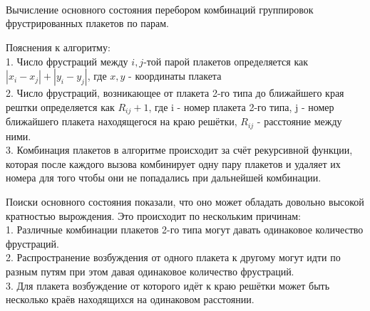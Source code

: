 \documentclass[utf8, babel, sor, jor, amsmath, amssymb, reprint]{elsarticle} %
\begin{document}
\begin{algorithm}[H]
\begin{algorithmic}
{		}
		{
			{
				{
					{
					}
					\ELSE 
					{}
					\ENDIF\\}
				\ENDFOR\\
			}
			\ENDFOR\\
		}
		
	\end{algorithmic}
	\caption{Вычисление основного состояния перебором комбинаций группировок фрустрированных плакетов по парам.}
	\label{alg:alg_2}
\end{algorithm}



Пояснения к алгоритму:\\
1. Число фрустраций между $i,j$-той парой плакетов определяется как $\left|x_i-x_j\right|+\left|y_i-y_j\right|$, где $x, y$ - координаты плакета\\
2. Число фрустраций, возникающее от плакета 2-го типа до ближайшего края рештки определяется как $R_{ij}+1$, где i - номер плакета 2-го типа, j - номер ближайшего плакета находящегося на краю решётки, $R_{ij}$ - расстояние между ними.\\
3. Комбинация плакетов в алгоритме происходит за счёт рекурсивной функции, которая после каждого вызова комбинирует одну пару плакетов и удаляет их номера для того чтобы они не попадались при дальнейшей комбинации. 

Поиски основного состояния показали, что оно может обладать довольно высокой кратностью вырождения. Это происходит по нескольким причинам:\\
1. Различные комбинации плакетов 2-го типа могут давать одинаковое количество фрустраций.\\
2. Распространение возбуждения от одного плакета к другому могут идти по разным путям при этом давая одинаковое количество фрустраций.\\
3. Для плакета возбуждение от которого идёт к краю решётки может быть несколько краёв находящихся на одинаковом расстоянии.\\
\end{document}
